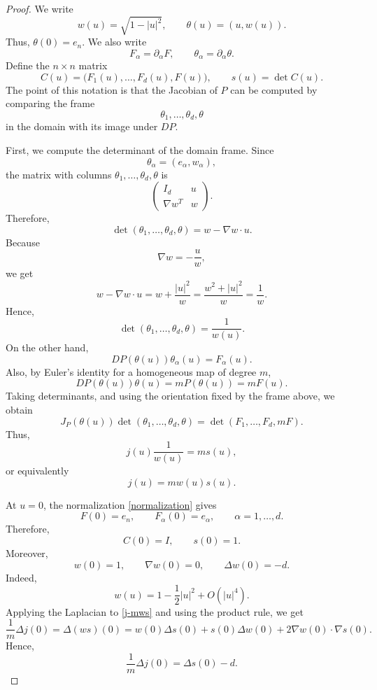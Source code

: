 \documentclass[10pt]{amsart}
\numberwithin{equation}{section}
\theoremstyle{definition}
\begin{document}
\begin{proof}
We write
\[
        w(u)=\sqrt{1-|u|^2},
        \qquad
        \theta(u)=(u,w(u)).
\]
Thus, \(\theta(0)=e_n\). We also write
\[
        F_\alpha=\partial_\alpha F,
        \qquad
        \theta_\alpha=\partial_\alpha\theta.
\]
Define the \(n\times n\) matrix
\[
        C(u)=\bigl(F_1(u),\ldots,F_d(u),F(u)\bigr),
        \qquad
        s(u)=\det C(u).
\]
The point of this notation is that the Jacobian of \(P\) can be computed by
comparing the frame
\[
        \theta_1,\ldots,\theta_d,\theta
\]
in the domain with its image under \(DP\).

First, we compute the determinant of the domain frame. Since
\[
        \theta_\alpha=(e_\alpha,w_\alpha),
\]
the matrix with columns \(\theta_1,\ldots,\theta_d,\theta\) is
\[
        \begin{pmatrix}
        I_d & u\\
        \nabla w^T & w
        \end{pmatrix}.
\]
Therefore,
\[
        \det(\theta_1,\ldots,\theta_d,\theta)
        =
        w-\nabla w\cdot u.
\]
Because
\[
        \nabla w=-\frac{u}{w},
\]
we get
\[
        w-\nabla w\cdot u
        =
        w+\frac{|u|^2}{w}
        =
        \frac{w^2+|u|^2}{w}
        =
        \frac1w.
\]
Hence,
\[
        \det(\theta_1,\ldots,\theta_d,\theta)=\frac1{w(u)}.
\]
On the other hand,
\[
        DP(\theta(u))\theta_\alpha(u)=F_\alpha(u).
\]
Also, by Euler's identity for a homogeneous map of degree \(m\),
\[
        DP(\theta(u))\theta(u)=mP(\theta(u))=mF(u).
\]
Taking determinants, and using the orientation fixed by the frame above, we
obtain
\[
        J_P(\theta(u))\det(\theta_1,\ldots,\theta_d,\theta)
        =
        \det(F_1,\ldots,F_d,mF).
\]
Thus,
\[
        j(u)\frac1{w(u)}=ms(u),
\]
or equivalently
\begin{equation}\label{j-mws}
        j(u)=mw(u)s(u).
\end{equation}

At \(u=0\), the normalization \eqref{normalization} gives
\[
        F(0)=e_n,\qquad F_\alpha(0)=e_\alpha,\qquad \alpha=1,\ldots,d.
\]
Therefore,
\[
        C(0)=I,
        \qquad
        s(0)=1.
\]
Moreover,
\[
        w(0)=1,
        \qquad
        \nabla w(0)=0,
        \qquad
        \Delta w(0)=-d.
\]
Indeed,
\[
        w(u)=1-\frac12|u|^2+O(|u|^4).
\]
Applying the Laplacian to \eqref{j-mws} and using the product rule, we get
\[
        \frac1m\Delta j(0)
        =
        \Delta(ws)(0)
        =
        w(0)\Delta s(0)+s(0)\Delta w(0)+2\nabla w(0)\cdot\nabla s(0).
\]
Hence,
\begin{equation}\label{Deltaj-Deltas}
        \frac1m\Delta j(0)=\Delta s(0)-d.
\end{equation}


\end{proof}
\end{document}
